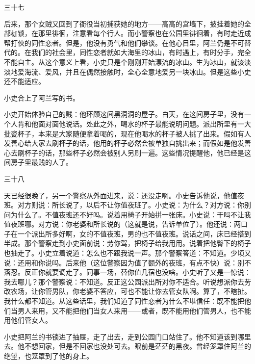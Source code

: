 三十七 

后来，那个女贼又回到了衙役当初捕获她的地方——高高的宫墙下，披挂着她的全部枷锁，在那里徘徊，注意看每个行人。而小警察也在公园里徘徊着，有时走近成帮打伙的同性恋者。但是，他没有勇气和他们攀谈。在他心目里，阿兰仍是不可替代的。在我们的社会里，同性恋者就如大海里的冰山，有时遇上，有时分手，完全不能自主。从这个意义上看，小史只是个刚刚开始漂流的冰山。生为冰山，就该淡淡地爱海流、爱风，并且在偶然接触时，全心全意地爱另一块冰山。但是这些小史还不能适应。 

小史合上了阿兰写的书。 

小史开始体验自己的贱：他环顾这间黑洞洞的屋子。白天，在这间房子里，没有一个人肯和他面对面他说话。处此之外，喝水的杯子最能说明问题。派出所里有一大批瓷杯子，本来是大家随便拿着喝的，现在他喝水的杯子被人挑了出来。假如有人发善心给大家去刷杯子的话，他用的杯子必然会被单独自挑出来；而假如是他发善心去刷杯子的话，那些杯子必然会被别人另刷一遍。这些情况提醒他，他已经是这间房子里最贱的人了。 

三十八 

天已经很晚了，另一个警察从外面进来，说：还没走啊。小史告诉他说，他值夜班。对方则说：所长说了，以后不让你值夜班了。小史说：为什么？对方说：你别问为什么了。不值夜班还不好吗。说着用椅子开始拼一张床。小史说：干吗不让我值夜班哪。对方说：你老婆和所长说的（这就是说，告诉单位了）。他还说：两口子在一个派出所多好啊，女的不值夜班，男的也不值夜班。说话之间，床已经搭到半成。那个警察走到小史面前说：劳你驾，把椅子给我用用。说着把他臀下的椅子也抽走了。小史立着说道：怎么也不跟我说一声。那个警察答道：不知道。少顷又说：还用和你说吗。后来他（这位警察因为值了额外的夜班，有点不快）说：别不落忍。反正你就要调走了。同事一场，替你值几宿也没啥。小史听了又是一惊说：我去哪儿？那个警察说：不知道。反正这公园派出所对你不适合。听说想派你去劳改农场，让你管男队，你老婆不答应，可也不能让你去管女队啊。算了，不瞎扯。我什么都不知道。从这些话里，我们知道了同性恋者为什么不堪信任：既不能把他们当男人来用，又不能把他们当女人来用——或者，既不能用他们管男人，也不能用他们管女人。 

小史把阿兰的书锁进了抽屉，走了出去，走到公园门口站住了。他不知道该到哪里去。他不想回家，但是不回家也没处可去。眼前是茫茫的黑夜。曾经笼罩住阿兰的绝望，也笼罩到了他的身上。
